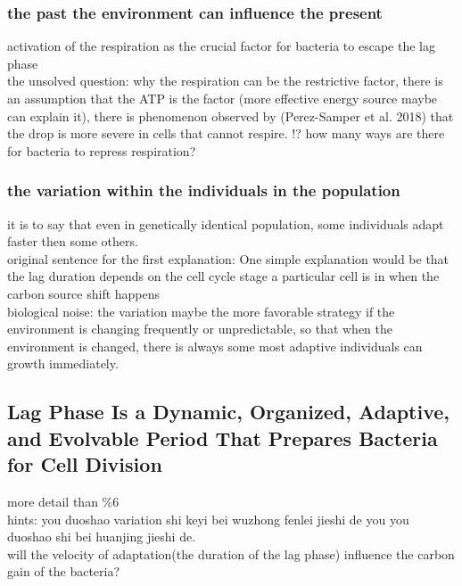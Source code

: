 \subsubsection{the past the environment can influence the present}
activation of the respiration as the crucial factor for bacteria to escape the lag phase\\
the unsolved question: why the respiration can be the restrictive factor, there is an assumption that the ATP is the factor (more effective energy source maybe can explain it), there is phenomenon observed by (Perez-Samper et al. 2018) that the drop is more severe in cells that cannot respire. !? how many ways are there for bacteria to repress respiration?
\subsubsection{the variation within the individuals in the population}
it is to say that even in genetically identical population, some individuals adapt faster then some others. \\
original sentence for the first explanation: One simple explanation would be that the lag duration depends on the cell cycle stage a particular cell is in when the carbon source shift happens\\
biological noise: the variation maybe the more favorable strategy if the environment is changing frequently or unpredictable, so that when the environment is changed, there is always some most adaptive individuals can growth immediately. \\


\subsection{Lag Phase Is a Dynamic, Organized, Adaptive, and Evolvable Period That Prepares Bacteria for Cell Division \citep{bertrand2019lag}}
more detail than \%6 \\




hints: you duoshao variation shi keyi bei wuzhong fenlei jieshi de you you duoshao shi bei huanjing jieshi de.\\

will the velocity of adaptation(the duration of the lag phase) influence the carbon gain of the bacteria? \\ 
\\



